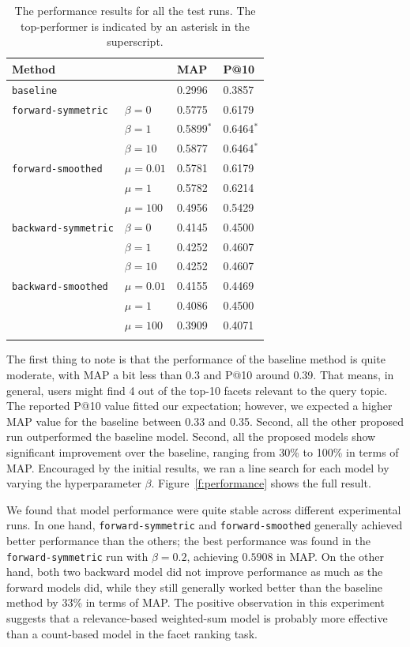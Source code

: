 \begin{table}[ht!]
  \centering
  \begin{tabular}{llll}
    Method & & MAP & P@10 \\
    \hline
    {\tt baseline} & & 0.2996 & 0.3857 \\
    {\tt forward-symmetric} & $\beta = 0$ & 0.5775 & 0.6179\\
    & $\beta = 1$ & 0.5899$^*$ & 0.6464$^*$ \\
    & $\beta = 10$ & 0.5877 & 0.6464$^*$ \\
    {\tt forward-smoothed} & $\mu = 0.01$ & 0.5781 & 0.6179 \\
    & $\mu = 1$ & 0.5782 & 0.6214 \\
    & $\mu = 100$ & 0.4956 & 0.5429 \\
    {\tt backward-symmetric} & $\beta = 0$ & 0.4145 & 0.4500\\
    & $\beta = 1$ & 0.4252 & 0.4607\\
    & $\beta = 10$ & 0.4252 & 0.4607\\
    {\tt backward-smoothed} & $\mu = 0.01$ & 0.4155 & 0.4469 \\
    & $\mu = 1$ & 0.4086 & 0.4500 \\
    & $\mu = 100$ & 0.3909 & 0.4071 \\
    \\
  \end{tabular}
  \caption{The performance results for all the test runs.  The top-performer is indicated by an asterisk in the superscript.}
  \label{t:performance}
\end{table}

The first thing to note is that the performance of the baseline method is quite
moderate, with MAP a bit less than 0.3 and P@10 around 0.39.  That means, in
general, users might find 4 out of the top-10 facets relevant to the query
topic.  The reported P@10 value fitted our expectation; however, we expected a
higher MAP value for the baseline between 0.33 and 0.35.  Second, all the other
proposed run outperformed the baseline model.  Second, all the proposed models
show significant improvement over the baseline, ranging from 30\% to 100\% in
terms of MAP.  Encouraged by the initial results, we ran a line search for each
model by varying the hyperparameter $\beta$.  Figure~\ref{f:performance} shows
the full result.  

We found that model performance were quite stable across different experimental
runs.  In one hand, {\tt forward-symmetric} and {\tt forward-smoothed}
generally achieved better performance than the others; the best performance was
found in the {\tt forward-symmetric} run with $\beta = 0.2$, achieving $0.5908$
in MAP.  On the other hand, both two backward model did not improve performance
as much as the forward models did, while they still generally worked better
than the baseline method by 33\% in terms of MAP.  The positive observation in
this experiment suggests that a relevance-based weighted-sum model is probably
more effective than a count-based model in the facet ranking task.  

